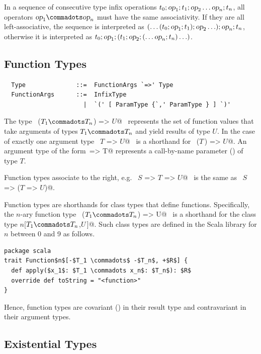 In a sequence of consecutive type infix operations $t_0; \mbox{\sl op}_1; t_1;
\mbox{\sl op}_2 \ldots \mbox{\sl op}_n; t_n$, all operators $\op_1 \commadots \op_n$ must have the same
associativity. If they are all left-associative, the sequence is
interpreted as $(\ldots(t_0;\mbox{\sl op}_1;t_1);\mbox{\sl op}_2\ldots);\mbox{\sl op}_n;t_n$,
otherwise it is interpreted as $t_0;\mbox{\sl op}_1;(t_1;\mbox{\sl op}_2;(\ldots\mbox{\sl op}_n;t_n)\ldots)$.

\subsection{Function Types}
\label{sec:function-types}

\syntax\begin{lstlisting}
  Type              ::=  FunctionArgs `=>' Type
  FunctionArgs      ::=  InfixType
                      |  `(' [ ParamType {`,' ParamType } ] `)'
\end{lstlisting}
The type ~\lstinline@($T_1 \commadots T_n$) => $U$@~ represents the set of function
values that take arguments of types $T_1 \commadots T_n$ and yield
results of type $U$.  In the case of exactly one argument type
~\lstinline@$T$ => $U$@~ is a shorthand for ~\lstinline@($T\,$) => $U$@.  
An argument type of the form~\lstinline@=> T@
represents a call-by-name parameter () of type $T$.

Function types associate to the right, e.g.
~\lstinline@$S$ => $T$ => $U$@~ is the same as 
~\lstinline@$S$ => ($T$ => $U$)@.

Function types are shorthands for class types that define 
functions.  Specifically, the $n$-ary function type 
~\lstinline@($T_1 \commadots T_n$) => U@~ is a shorthand for the class type
\lstinline@Function$n$[$T_1 \commadots T_n$,$U\,$]@. Such class
types are defined in the Scala library for $n$ between 0 and 9 as follows.
\begin{lstlisting}
package scala 
trait Function$n$[-$T_1 \commadots$ -$T_n$, +$R$] {
  def apply($x_1$: $T_1 \commadots x_n$: $T_n$): $R$ 
  override def toString = "<function>" 
}
\end{lstlisting}
Hence, function types are covariant () in their
result type and contravariant in their argument types.


\subsection{Existential Types}
\label{sec:existential-types}

